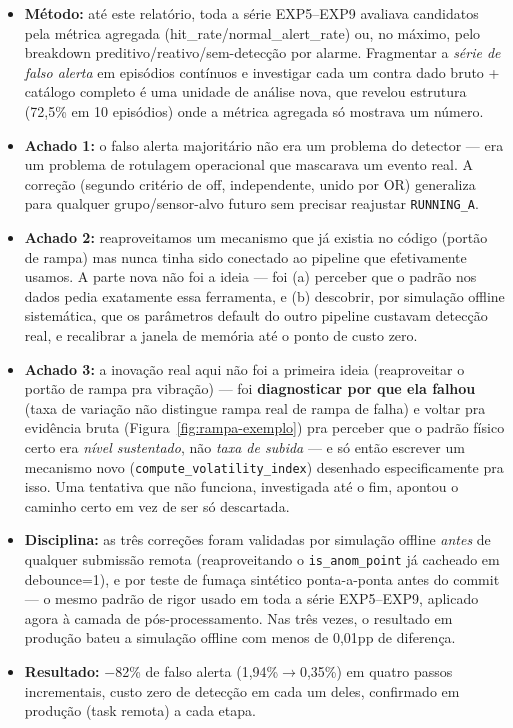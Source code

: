 \documentclass[11pt,a4paper]{article}
\begin{document}
\begin{itemize}
  \item \textbf{Método:} até este relatório, toda a série EXP5--EXP9
        avaliava candidatos pela métrica agregada
        (hit\_rate/normal\_alert\_rate) ou, no máximo, pelo breakdown
        preditivo/reativo/sem-detecção por alarme. Fragmentar a
        \emph{série de falso alerta} em episódios contínuos e investigar
        cada um contra dado bruto + catálogo completo é uma unidade de
        análise nova, que revelou estrutura (72,5\% em 10 episódios)
        onde a métrica agregada só mostrava um número.
  \item \textbf{Achado 1:} o falso alerta majoritário não era um
        problema do detector --- era um problema de rotulagem
        operacional que mascarava um evento real. A correção (segundo
        critério de off, independente, unido por OR) generaliza para
        qualquer grupo/sensor-alvo futuro sem precisar reajustar
        \texttt{RUNNING\_A}.
  \item \textbf{Achado 2:} reaproveitamos um mecanismo que já existia no
        código (portão de rampa) mas nunca tinha sido conectado ao
        pipeline que efetivamente usamos. A parte nova não foi a ideia
        --- foi (a) perceber que o padrão nos dados pedia exatamente essa
        ferramenta, e (b) descobrir, por simulação offline sistemática,
        que os parâmetros default do outro pipeline custavam detecção
        real, e recalibrar a janela de memória até o ponto de custo
        zero.
  \item \textbf{Achado 3:} a inovação real aqui não foi a primeira ideia
        (reaproveitar o portão de rampa pra vibração) --- foi
        \textbf{diagnosticar por que ela falhou} (taxa de variação não
        distingue rampa real de rampa de falha) e voltar pra evidência
        bruta (Figura~\ref{fig:rampa-exemplo}) pra perceber que o padrão
        físico certo era \emph{nível sustentado}, não \emph{taxa de
        subida} --- e só então escrever um mecanismo novo
        (\texttt{compute\_volatility\_index}) desenhado especificamente
        pra isso. Uma tentativa que não funciona, investigada até o fim,
        apontou o caminho certo em vez de ser só descartada.
  \item \textbf{Disciplina:} as três correções foram validadas por
        simulação offline \emph{antes} de qualquer submissão remota
        (reaproveitando o \texttt{is\_anom\_point} já cacheado em
        debounce=1), e por teste de fumaça sintético ponta-a-ponta antes
        do commit --- o mesmo padrão de rigor usado em toda a série
        EXP5--EXP9, aplicado agora à camada de pós-processamento. Nas
        três vezes, o resultado em produção bateu a simulação offline
        com menos de 0,01pp de diferença.
  \item \textbf{Resultado:} $-$82\% de falso alerta (1,94\%$\to$0,35\%)
        em quatro passos incrementais, custo zero de detecção em cada um
        deles, confirmado em produção (task remota) a cada etapa.
\end{itemize}
\end{document}

